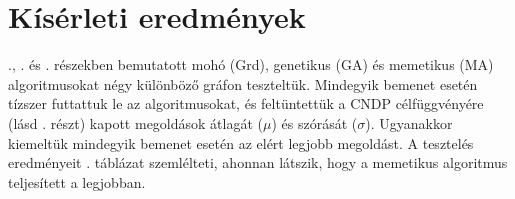 \section{Kísérleti eredmények}


., . és . részekben bemutatott mohó (Grd), genetikus (GA) és memetikus (MA) algoritmusokat négy különböző gráfon teszteltük.
Mindegyik bemenet esetén tízszer futtattuk le az algoritmusokat, és feltüntettük a CNDP célfüggvényére (lásd . részt) kapott megoldások átlagát ($\mu$) és szórását ($\sigma$).
Ugyanakkor kiemeltük mindegyik bemenet esetén az elért legjobb megoldást.
A tesztelés eredményeit . táblázat szemlélteti, ahonnan látszik, hogy a memetikus algoritmus teljesített a legjobban.

\begin{table}[b]
  \centering
  \caption{
    A három algoritmus eredményei a CNDP célfüggvényére.
  }\label{tab:CNDP_RESULTS}
\end{table}
